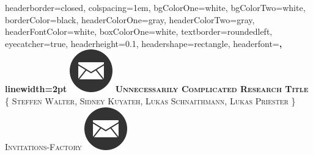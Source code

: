 \documentclass[landscape,a0paper,fontscale=0.285]{baposter} %
\begin{document}
\begin{poster}
{
headerborder=closed, %
colspacing=1em, %
bgColorOne=white, %
bgColorTwo=white, %
borderColor=black, %
headerColorOne=gray, %
headerColorTwo=gray, %
headerFontColor=white, %
boxColorOne=white, %
textborder=roundedleft, %
eyecatcher=true, %
headerheight=0.1\textheight, %
headershape=rectangle, %
headerfont=\Large\bf\textsc, %
linewidth=2pt %
}
%
{\includegraphics[height=5em]{favicon.png}} %
{\bf\textsc{Unnecessarily Complicated Research Title}\vspace{0.5em}} %
{\textsc{\{ Steffen Walter, Sidney Kuyateh, Lukas Schnaithmann, Lukas Priester \} \hspace{12pt} Invitations-Factory}} %
{\includegraphics[height=5em]{favicon.png}} %



\end{poster}
\end{document}
